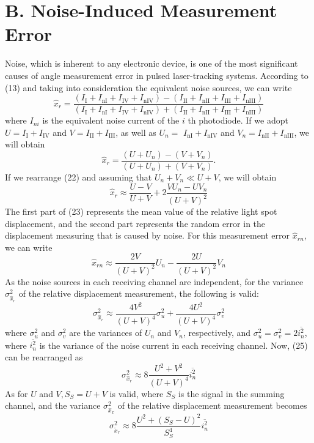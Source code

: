 \documentclass[10pt]{article}
\begin{document}
\section{B. Noise-Induced Measurement Error}
Noise, which is inherent to any electronic device, is one of the most significant causes of angle measurement error in pulsed laser-tracking systems. According to (13) and taking into consideration the equivalent noise sources, we can write
\[
\hat{x}_{r}=\frac{\left(I_{\mathrm{I}}+I_{\mathrm{nI}}+I_{\mathrm{IV}}+I_{\mathrm{nIV}}\right)-\left(I_{\mathrm{II}}+I_{\mathrm{nII}}+I_{\mathrm{III}}+I_{\mathrm{nIII}}\right)}{\left(I_{\mathrm{I}}+I_{\mathrm{nI}}+I_{\mathrm{IV}}+I_{\mathrm{nIV}}\right)+\left(I_{\mathrm{II}}+I_{\mathrm{nII}}+I_{\mathrm{III}}+I_{\mathrm{nIII}}\right)}
\]
where \(I_{n i}\) is the equivalent noise current of the \(i\) th photodiode. If we adopt \(U=I_{\mathrm{I}}+I_{\mathrm{IV}}\) and \(V=I_{\mathrm{II}}+I_{\mathrm{III}}\), as well as \(U_{n}=\) \(I_{\mathrm{nI}}+I_{\mathrm{nIV}}\) and \(V_{n}=I_{\mathrm{nII}}+I_{\mathrm{nIII}}\), we will obtain
\[
\hat{x}_{r}=\frac{\left(U+U_{n}\right)-\left(V+V_{n}\right)}{\left(U+U_{n}\right)+\left(V+V_{n}\right)} .
\]
If we rearrange (22) and assuming that \(U_{n}+V_{n} \ll U+V\), we will obtain
\[
\hat{x}_{r} \approx \frac{U-V}{U+V}+2 \frac{V U_{n}-U V_{n}}{(U+V)^{2}}
\]
The first part of (23) represents the mean value of the relative light spot displacement, and the second part represents the random error in the displacement measuring that is caused by noise. For this measurement error \(\hat{x}_{r n}\), we can write
\[
\hat{x}_{r n} \approx \frac{2 V}{(U+V)^{2}} U_{n}-\frac{2 U}{(U+V)^{2}} V_{n}
\]
As the noise sources in each receiving channel are independent, for the variance \(\sigma_{\hat{x}_{r}}^{2}\) of the relative displacement measurement, the following is valid:
\[
\sigma_{\hat{x}_{r}}^{2} \approx \frac{4 V^{2}}{(U+V)^{4}} \sigma_{u}^{2}+\frac{4 U^{2}}{(U+V)^{4}} \sigma_{v}^{2}
\]
where \(\sigma_{u}^{2}\) and \(\sigma_{v}^{2}\) are the variances of \(U_{n}\) and \(V_{n}\), respectively, and \(\sigma_{u}^{2}=\sigma_{v}^{2}=2 \overline{i_{n}^{2}}\), where \(\overline{i_{n}^{2}}\) is the variance of the noise current in each receiving channel. Now, (25) can be rearranged as
\[
\sigma_{\hat{x}_{r}}^{2} \approx 8 \frac{U^{2}+V^{2}}{(U+V)^{4}} \overline{i_{n}^{2}}
\]
As for \(U\) and \(V, S_{S}=U+V\) is valid, where \(S_{S}\) is the signal in the summing channel, and the variance \(\sigma_{\hat{x}_{x}}^{2}\) of the relative displacement measurement becomes
\[
\sigma_{\tilde{x}_{r}}^{2} \approx 8 \frac{U^{2}+\left(S_{S}-U\right)^{2}}{S_{S}^{4}} \overline{i_{n}^{2}}
\]
\end{document}
